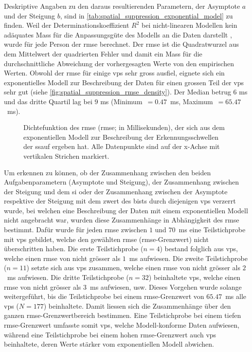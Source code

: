 \documentclass[11pt, twoside, a4paper]{book}		%
\begin{document}
Deskriptive Angaben zu den daraus resultierenden Parametern, der Asymptote $a$ und der Steigung $b$, sind in \autoref{tab:spatial_suppression_exponential_model} zu finden.
Weil der Determinationskoeffizient $R^2$ bei nicht-linearen Modellen kein adäquates Mass für die Anpassungsgüte des Modells an die Daten darstellt \citep{Spiess2010}, wurde für jede Person der \gls{rmse} berechnet. Der \gls{rmse} ist die Quadratwurzel aus dem Mittelwert der quadrierten Fehler und damit ein Mass für die durchschnittliche Abweichung der vorhergesagten Werte von den empirischen Werten. 
Obwohl der \gls{rmse} für einige \glspl{vp} sehr gross ausfiel, eignete sich ein exponentielles Modell zur Beschreibung der Daten für einen grossen Teil der \glspl{vp} sehr gut (siehe \autoref{fig:spatial_suppression_rmse_density}). Der Median betrug $6$ ms und das dritte Quartil lag bei $9$ ms (Minimum~$=0.47$~ms, Maximum~$=65.47$~ms).

\begin{figure}[t]
	\centering
	\begin{adjustbox}{width=1\textwidth}
		
	\end{adjustbox}
	\caption[Dichtefunktion des aus der \gls{ssauf} mit einer exponentiellen Regression abgeleiteten \gls{rmse}]{Dichtefunktion des \acrlong{rmse} (\gls{rmse}; in Millisekunden), der sich aus dem exponentiellen Modell zur Beschreibung der Erkennungsschwellen der \gls{ssauf} ergeben hat. Alle Datenpunkte sind auf der x-Achse mit vertikalen Strichen markiert.}
	\label{fig:spatial_suppression_rmse_density}
\end{figure}

Um erkennen zu können, ob der Zusammenhang zwischen den beiden Aufgabenparametern (Asymptote und Steigung), der Zusammenhang zwischen der Steigung und dem \gls{si} oder der Zusammenhang zwischen der Asymptote respektive der Steigung mit dem \gls{zwert} des \gls{bist}s durch diejenigen \glspl{vp} verzerrt wurde, bei welchen eine Beschreibung der Daten mit einem exponentiellen Modell nicht angebracht war, wurden diese Zusammenhänge in Abhängigkeit des \gls{rmse} bestimmt. 
Dafür wurde für jeden \gls{rmse} zwischen $1$ und $70$~ms eine Teilstichprobe mit \glspl{vp} gebildet, welche den gewählten \gls{rmse} (\gls{rmse}-Grenzwert) nicht überschritten haben. Die erste Teilstichprobe ($n=4$) bestand folglich aus \glspl{vp}, welche einen \gls{rmse} von nicht grösser als $1$~ms aufwiesen. Die zweite Teilstichprobe ($n=11$) setzte sich aus \glspl{vp} zusammen, welche einen \gls{rmse} von nicht grösser als $2$~ms aufwiesen. Die dritte Teilstichprobe ($n=32$) beinhaltete \glspl{vp}, welche einen \gls{rmse} von nicht grösser als $3$~ms aufwiesen, usw. Dieses Vorgehen wurde solange weitergeführt, bis die Teilstichprobe bei einem \gls{rmse}-Grenzwert von $65.47$~ms alle \glspl{vp} ($N=177$) beinhaltete. 
Damit liessen sich die Zusammenhänge über den ganzen \gls{rmse}-Grenz\-wert\-be\-reich bestimmen. Eine Teilstichprobe bei einem tiefen \gls{rmse}-Grenz\-wert umfasste somit \glspl{vp}, welche Modell-konforme Daten aufwiesen, während eine Teilstichprobe bei einem hohen \gls{rmse}-Grenzwert auch \glspl{vp} beinhaltete, deren Werte stärker vom exponentiellen Modell abwichen.
\end{document}
